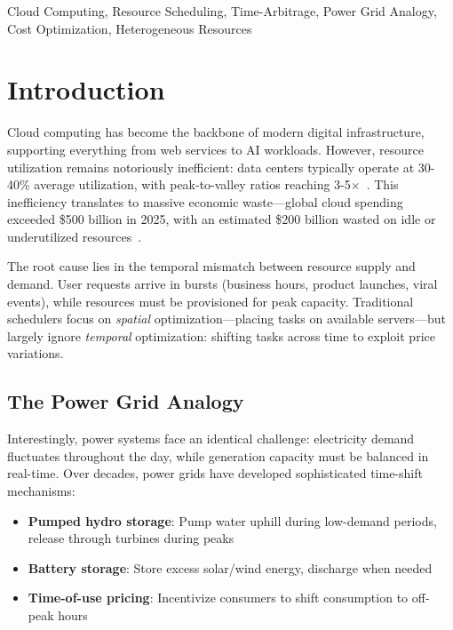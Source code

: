 \documentclass[10pt,conference]{IEEEtran}
\begin{document}
\begin{IEEEkeywords}
Cloud Computing, Resource Scheduling, Time-Arbitrage, Power Grid Analogy, Cost Optimization, Heterogeneous Resources
\end{IEEEkeywords}

\section{Introduction}
\label{sec:introduction}

Cloud computing has become the backbone of modern digital infrastructure, supporting everything from web services to AI workloads. However, resource utilization remains notoriously inefficient: data centers typically operate at 30-40\% average utilization, with peak-to-valley ratios reaching 3-5$\times$~\cite{barroso2013datacenter}. This inefficiency translates to massive economic waste—global cloud spending exceeded \$500 billion in 2025, with an estimated \$200 billion wasted on idle or underutilized resources~\cite{gartner2025cloud}.

The root cause lies in the temporal mismatch between resource supply and demand. User requests arrive in bursts (business hours, product launches, viral events), while resources must be provisioned for peak capacity. Traditional schedulers focus on \textit{spatial} optimization—placing tasks on available servers—but largely ignore \textit{temporal} optimization: shifting tasks across time to exploit price variations.

\subsection{The Power Grid Analogy}

Interestingly, power systems face an identical challenge: electricity demand fluctuates throughout the day, while generation capacity must be balanced in real-time. Over decades, power grids have developed sophisticated time-shift mechanisms:
\begin{itemize}
    \item \textbf{Pumped hydro storage}: Pump water uphill during low-demand periods, release through turbines during peaks
    \item \textbf{Battery storage}: Store excess solar/wind energy, discharge when needed
    \item \textbf{Time-of-use pricing}: Incentivize consumers to shift consumption to off-peak hours
\end{itemize}
\end{document}
